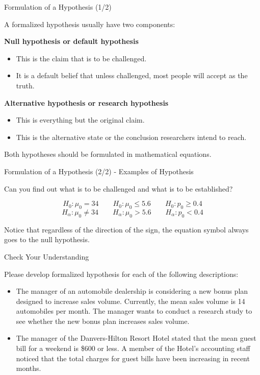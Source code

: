 \documentclass{beamer}
\begin{document}
\begin{frame}{Formulation of a Hypothesis (1/2)}

A formalized hypothesis usually have two components: 

\vspace{0.3 cm}

\textbf{Null hypothesis or default hypothesis}
\begin{itemize}
\item This is the claim that is to be challenged.
\item It is a default belief that unless challenged, most people will accept as the truth. 
\end{itemize}

\textbf{Alternative hypothesis or research hypothesis}

\begin{itemize}
\item This is everything but the original claim.
\item This is the alternative state or the conclusion researchers intend to reach.
\end{itemize}

\vspace{0.3 cm}
Both hypotheses should be formulated in mathematical equations.


\end{frame}




\begin{frame}{Formulation of a Hypothesis (2/2) - Examples of Hypothesis}

Can you find out what is to be challenged and what is to be established? 

$$ H_0: \mu_0 = 34 \quad \quad H_0: \mu_0 \leq 5.6 \quad \quad H_0: p_0 \geq 0.4 $$
$$ H_\alpha: \mu_0 \neq 34 \quad \quad H_\alpha: \mu_0 > 5.6 \quad \quad H_\alpha: p_0 < 0.4 $$


Notice that regardless of the direction of the sign, the equation symbol always goes to the null hypothesis. 


\end{frame}


\begin{frame}{Check Your Understanding}

Please develop formalized hypothesis for each of the following descriptions: 

\begin{itemize}
\item The manager of an automobile dealership is considering a new bonus plan designed to increase sales volume. Currently, the mean sales volume is 14 automobiles per month. The manager wants to conduct a research study to see whether the new bonus plan increases sales volume.
\item The manager of the Danvers-Hilton Resort Hotel stated that the mean guest bill for a weekend is \$600 or less. A member of the Hotel’s accounting staff noticed that the total charges for guest bills have been increasing in recent months.
\end{itemize}


\end{frame}
\end{document}
